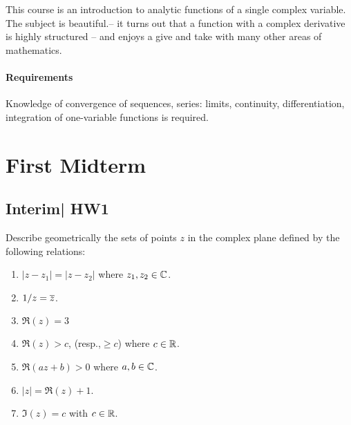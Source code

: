 \documentclass[12pt]{memoir}
\begin{document}
\maketitle
{\small
\setlength{\parindent}{0em}
\setlength{\parskip}{1em}

This course is an introduction to analytic functions of a single complex variable.  The subject is beautiful.-- it turns out that a function with a complex derivative is highly structured -- and enjoys a give and take with many other areas of mathematics.

\subsubsection*{Requirements}
Knowledge of convergence of sequences, series: limits, continuity, differentiation, integration of one-variable functions is required.
}
\newpage
\tableofcontents
\chapter{First Midterm}

\section{Interim| HW1}

\begin{Ej}
Describe geometrically the sets of points $z$ in the complex plane defined by the following relations:
\begin{enumerate}
    \itemsep=-0.4em
    \item $|z-z_1|=|z-z_2|$ where $z_1,z_2\in\mathbb{C}$.
    \item $1/z=\overline z$.
    \item $\Re(z)=3$
    \item $\Re(z)>c$, (resp.,$\geq c$) where $c\in\mathbb{R}$.
    \item $\Re(az+b)>0$ where $a,b\in\mathbb{C}$.
    \item $|z|=\Re(z)+1$.
    \item $\Im(z)=c$ with $c\in\mathbb{R}$.
\end{enumerate}
\end{Ej}
\end{document}
